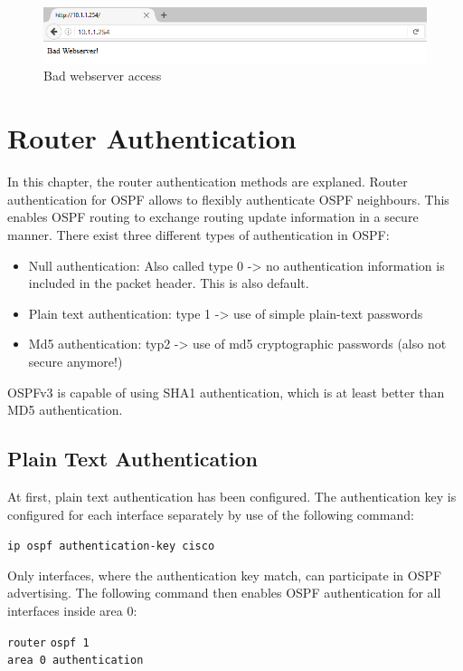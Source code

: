 \begin{figure}[H]
	\centering
	\includegraphics[width=1.0\textwidth]{img/BadWebserverScreenshot.png}
	\caption{Bad webserver access}
	\label{img:BadWebserverScreenshot}
\end{figure}

\chapter{Router Authentication}

In this chapter, the router authentication methods are explaned. Router authentication for \ac{OSPF} allows to flexibly authenticate \ac{OSPF} neighbours. This enables \ac{OSPF} routing to exchange routing update information in a secure manner.
There exist three different types of authentication in OSPF:
\begin{itemize}
\item Null authentication: Also called type 0 -> no authentication information is included in the packet header. This is also default.
\item Plain text authentication: type 1 -> use of simple plain-text passwords
\item Md5 authentication: typ2 -> use of md5 cryptographic passwords (also not secure anymore!)
\end{itemize}

OSPFv3 is capable of using SHA1 authentication, which is at least better than MD5 authentication.

\section{Plain Text Authentication}

At first, plain text authentication has been configured.
The authentication key is configured for each interface separately by use of the following command:

\texttt{ip ospf authentication-key cisco}

Only interfaces, where the authentication key match, can participate in OSPF advertising.
The following command then enables OSPF authentication for all interfaces inside area 0:

\begin{tabbing}
\texttt{router} \= \texttt{ospf 1} \\
\> \texttt{area 0 authentication}
\end{tabbing}

